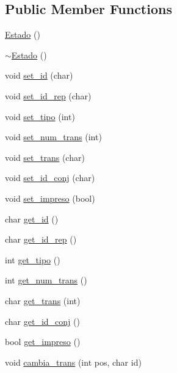 \subsection*{Public Member Functions}
\begin{DoxyCompactItemize}
\item 
\hyperlink{classEstado_aa956f333e0d0b9c54bc8c94055966ea2}{Estado} ()
\item 
\hyperlink{classEstado_a8bb18423eb811e665d831fcaeb0ccf70}{$\sim$\+Estado} ()
\item 
void \hyperlink{classEstado_a1e874111cfafc68c6ab39c7dad5a43a4}{set\+\_\+id} (char)
\item 
void \hyperlink{classEstado_a62752c6851c3c7120f7eabbef45f5dc5}{set\+\_\+id\+\_\+rep} (char)
\item 
void \hyperlink{classEstado_a583f82e7e7a75aa736b6f343dd34485a}{set\+\_\+tipo} (int)
\item 
void \hyperlink{classEstado_aff91838681991dd981d8ba044d0f81e6}{set\+\_\+num\+\_\+trans} (int)
\item 
void \hyperlink{classEstado_a81a3a7a9f2375f593658fb5fff25e5d9}{set\+\_\+trans} (char)
\item 
void \hyperlink{classEstado_a5a151aa6aa1c461b9c7ef1766e3af6ea}{set\+\_\+id\+\_\+conj} (char)
\item 
void \hyperlink{classEstado_a621930abb9101a531e0661a0d15d8bc8}{set\+\_\+impreso} (bool)
\item 
char \hyperlink{classEstado_a49e86800510d41bf2305f12e06e9b643}{get\+\_\+id} ()
\item 
char \hyperlink{classEstado_a4b4836f8937ceaf9f80bf78b31b0d03a}{get\+\_\+id\+\_\+rep} ()
\item 
int \hyperlink{classEstado_a8c7b58bbc9be55203df242465495d9e2}{get\+\_\+tipo} ()
\item 
int \hyperlink{classEstado_a3d4cf6c9cc162a55a2e1ff2e68fd06db}{get\+\_\+num\+\_\+trans} ()
\item 
char \hyperlink{classEstado_a71ea0a4f4cc0258b70165edc36fa2746}{get\+\_\+trans} (int)
\item 
char \hyperlink{classEstado_a1104ea1ad4ea5e68604dd3d76801e6d6}{get\+\_\+id\+\_\+conj} ()
\item 
bool \hyperlink{classEstado_a0f151c7dfe2c751b1a287e137cd96a28}{get\+\_\+impreso} ()
\item 
void \hyperlink{classEstado_a716a68e7ec56b17040b1acbd7e66f538}{cambia\+\_\+trans} (int pos, char id)
\end{DoxyCompactItemize}
